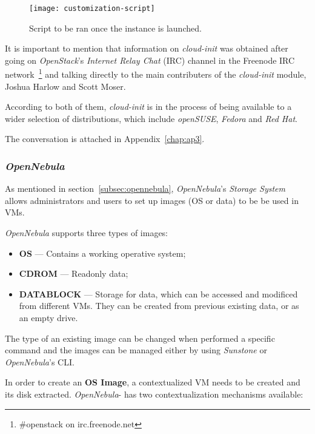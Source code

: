 \begin{figure}[h!]
  \begin{center}
    \leavevmode
    \texttt{[image: customization-script]}
    \caption{Script to be ran once the instance is launched.}
    \label{fig:customization-script}
  \end{center} 
\end{figure}


It is important to mention that information on \textit{cloud-init} was obtained after going on \textit{OpenStack}'s \textit{Internet Relay Chat} (IRC) channel in the Freenode IRC network~\footnote{\#openstack on irc.freenode.net} and talking directly to the main contributers of the \textit{cloud-init} module, Joshua Harlow and Scott Moser.

According to both of them, \textit{cloud-init} is in the process of being available to a wider selection of distributions, which include \textit{openSUSE}, \textit{Fedora} and \textit{Red Hat}. 

The conversation is attached in Appendix~\ref{chap:ap3}.
\clearpage
\subsubsection{\textit{OpenNebula}}

As mentioned in section~\ref{subsec:opennebula}, \textit{OpenNebula}'s \textit{Storage System} allows administrators and users to set up images (OS or data) to be be used in VMs. 

\textit{OpenNebula} supports three types of images:

\begin{itemize}
\item \textbf{OS} --- Contains a working operative system;
\item \textbf{CDROM} --- Readonly data;
\item \textbf{DATABLOCK} --- Storage for data, which can be accessed and modificed from different VMs. They can be created from previous existing data, or as an empty drive.
\end{itemize}

The type of an existing image can be changed when performed a specific command and the images can be managed either by using \textit{Sunstone} or \textit{OpenNebula}'s CLI.

In order to create an \textbf{OS Image}, a contextualized VM needs to be created and its disk extracted.
\textit{OpenNebula}- has two contextualization mechanisms available:

